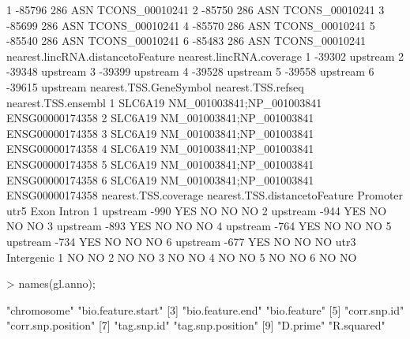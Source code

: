 \documentclass[a4paper]{article}
\begin{document}
\begin{Schunk}
\begin{Soutput}
1            -85796              286        ASN     TCONS_00010241
2            -85750              286        ASN     TCONS_00010241
3            -85699              286        ASN     TCONS_00010241
4            -85570              286        ASN     TCONS_00010241
5            -85540              286        ASN     TCONS_00010241
6            -85483              286        ASN     TCONS_00010241
  nearest.lincRNA.distancetoFeature nearest.lincRNA.coverage
1                            -39302                 upstream
2                            -39348                 upstream
3                            -39399                 upstream
4                            -39528                 upstream
5                            -39558                 upstream
6                            -39615                 upstream
  nearest.TSS.GeneSymbol        nearest.TSS.refseq nearest.TSS.ensembl
1                SLC6A19 NM_001003841;NP_001003841     ENSG00000174358
2                SLC6A19 NM_001003841;NP_001003841     ENSG00000174358
3                SLC6A19 NM_001003841;NP_001003841     ENSG00000174358
4                SLC6A19 NM_001003841;NP_001003841     ENSG00000174358
5                SLC6A19 NM_001003841;NP_001003841     ENSG00000174358
6                SLC6A19 NM_001003841;NP_001003841     ENSG00000174358
  nearest.TSS.coverage nearest.TSS.distancetoFeature Promoter utr5 Exon Intron
1             upstream                          -990      YES   NO   NO     NO
2             upstream                          -944      YES   NO   NO     NO
3             upstream                          -893      YES   NO   NO     NO
4             upstream                          -764      YES   NO   NO     NO
5             upstream                          -734      YES   NO   NO     NO
6             upstream                          -677      YES   NO   NO     NO
  utr3 Intergenic
1   NO         NO
2   NO         NO
3   NO         NO
4   NO         NO
5   NO         NO
6   NO         NO
\end{Soutput}
\begin{Sinput}
> names(gl.anno);
\end{Sinput}
\begin{Soutput}
 [1] "chromosome"                        "bio.feature.start"                
 [3] "bio.feature.end"                   "bio.feature"                      
 [5] "corr.snp.id"                       "corr.snp.position"                
 [7] "tag.snp.id"                        "tag.snp.position"                 
 [9] "D.prime"                           "R.squared"                        

\end{Soutput}
\end{Schunk}
\end{document}
